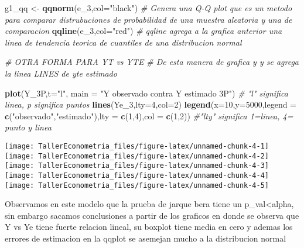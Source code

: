 \documentclass[
]{article}
\newenvironment{Shaded}{\begin{snugshade}}{\end{snugshade}}
\newcommand{\CommentTok}[1]{\textcolor[rgb]{0.56,0.35,0.01}{\textit{#1}}}
\newcommand{\DataTypeTok}[1]{\textcolor[rgb]{0.13,0.29,0.53}{#1}}
\newcommand{\DecValTok}[1]{\textcolor[rgb]{0.00,0.00,0.81}{#1}}
\newcommand{\KeywordTok}[1]{\textcolor[rgb]{0.13,0.29,0.53}{\textbf{#1}}}
\newcommand{\NormalTok}[1]{#1}
\newcommand{\StringTok}[1]{\textcolor[rgb]{0.31,0.60,0.02}{#1}}
\begin{document}
\begin{Shaded}
\begin{Highlighting}[]
\NormalTok{g1_qq <-}\StringTok{ }\KeywordTok{qqnorm}\NormalTok{(e_}\DecValTok{3}\NormalTok{,}\DataTypeTok{col=}\StringTok{"black"}\NormalTok{) }\CommentTok{# Genera una Q-Q plot que es un metodo para comparar distrubuciones de probabilidad de una muestra aleatoria y una de comparacion  }
\KeywordTok{qqline}\NormalTok{(e_}\DecValTok{3}\NormalTok{,}\DataTypeTok{col=}\StringTok{"red"}\NormalTok{) }\CommentTok{# qqline agrega a la grafica anterior una linea de tendencia teorica de cuantiles de una distribucion normal }

\CommentTok{# OTRA FORMA PARA YT vs YTE}
\CommentTok{# De esta manera de grafica y y se agrega la linea LINES de yte estimado }

\KeywordTok{plot}\NormalTok{(Y_3P,}\DataTypeTok{t=}\StringTok{"l"}\NormalTok{, }\DataTypeTok{main =} \StringTok{"Y observado contra Y estimado 3P"}\NormalTok{) }\CommentTok{#   "l" significa linea, p significa puntos}
\KeywordTok{lines}\NormalTok{(Ye_}\DecValTok{3}\NormalTok{,}\DataTypeTok{lty=}\DecValTok{4}\NormalTok{,}\DataTypeTok{col=}\DecValTok{2}\NormalTok{)}
\KeywordTok{legend}\NormalTok{(}\DataTypeTok{x=}\DecValTok{10}\NormalTok{,}\DataTypeTok{y=}\DecValTok{5000}\NormalTok{,}\DataTypeTok{legend =} \KeywordTok{c}\NormalTok{(}\StringTok{"observado"}\NormalTok{,}\StringTok{"estimado"}\NormalTok{),}\DataTypeTok{lty =} \KeywordTok{c}\NormalTok{(}\DecValTok{1}\NormalTok{,}\DecValTok{4}\NormalTok{),}\DataTypeTok{col =} \KeywordTok{c}\NormalTok{(}\DecValTok{1}\NormalTok{,}\DecValTok{2}\NormalTok{)) }\CommentTok{#"lty" significa 1=linea, 4= punto y linea }
\end{Highlighting}
\end{Shaded}

\begin{center}\texttt{[image: TallerEconometria\_files/figure-latex/unnamed-chunk-4-1]} \texttt{[image: TallerEconometria\_files/figure-latex/unnamed-chunk-4-2]} \texttt{[image: TallerEconometria\_files/figure-latex/unnamed-chunk-4-3]} \texttt{[image: TallerEconometria\_files/figure-latex/unnamed-chunk-4-4]} \texttt{[image: TallerEconometria\_files/figure-latex/unnamed-chunk-4-5]} \end{center}

Observamos en este modelo que la prueba de jarque bera tiene un
p\_val\textless alpha, sin embargo sacamos conclusiones a partir de los
graficos en donde se observa que Y vs Ye tiene fuerte relacion lineal,
su boxplot tiene media en cero y ademas los errores de estimacion en la
qqplot se asemejan mucho a la distribucion normal
\end{document}

